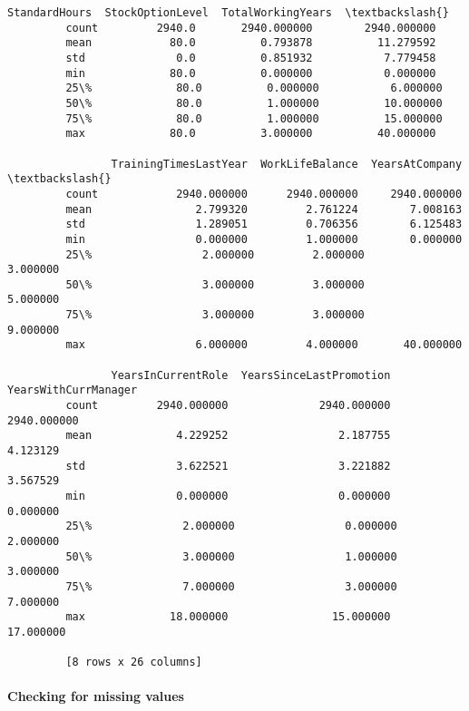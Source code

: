 \documentclass[11pt]{article}
\begin{document}
\begin{Verbatim}[commandchars=\\\{\}]
                StandardHours  StockOptionLevel  TotalWorkingYears  \textbackslash{}
         count         2940.0       2940.000000        2940.000000   
         mean            80.0          0.793878          11.279592   
         std              0.0          0.851932           7.779458   
         min             80.0          0.000000           0.000000   
         25\%             80.0          0.000000           6.000000   
         50\%             80.0          1.000000          10.000000   
         75\%             80.0          1.000000          15.000000   
         max             80.0          3.000000          40.000000   
         
                TrainingTimesLastYear  WorkLifeBalance  YearsAtCompany  \textbackslash{}
         count            2940.000000      2940.000000     2940.000000   
         mean                2.799320         2.761224        7.008163   
         std                 1.289051         0.706356        6.125483   
         min                 0.000000         1.000000        0.000000   
         25\%                 2.000000         2.000000        3.000000   
         50\%                 3.000000         3.000000        5.000000   
         75\%                 3.000000         3.000000        9.000000   
         max                 6.000000         4.000000       40.000000   
         
                YearsInCurrentRole  YearsSinceLastPromotion  YearsWithCurrManager  
         count         2940.000000              2940.000000           2940.000000  
         mean             4.229252                 2.187755              4.123129  
         std              3.622521                 3.221882              3.567529  
         min              0.000000                 0.000000              0.000000  
         25\%              2.000000                 0.000000              2.000000  
         50\%              3.000000                 1.000000              3.000000  
         75\%              7.000000                 3.000000              7.000000  
         max             18.000000                15.000000             17.000000  
         
         [8 rows x 26 columns]
\end{Verbatim}
            
    \paragraph{Checking for missing
values}\label{checking-for-missing-values}
\end{document}
